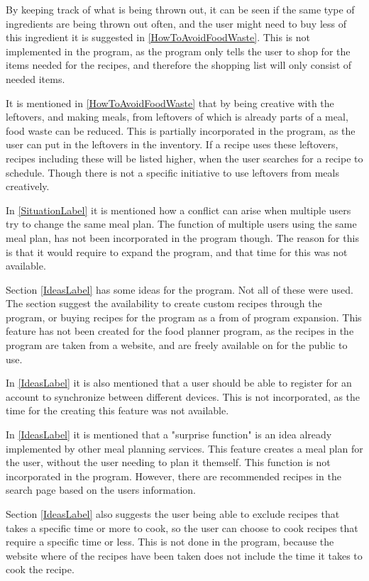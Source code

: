 By keeping track of what is being thrown out, it can be seen if the same type of ingredients are being thrown out often, and the user might need to buy less of this ingredient it is suggested in \cref{HowToAvoidFoodWaste}. This is not implemented in the program, as the program only tells the user to shop for the items needed for the recipes, and therefore the shopping list will only consist of needed items. 

It is mentioned in \cref{HowToAvoidFoodWaste} that by being creative with the leftovers, and making meals, from leftovers of which is already parts of a meal, food waste can be reduced. This is partially incorporated in the program, as the user can put in the leftovers in the inventory. If a recipe uses these leftovers, recipes including these will be listed higher, when the user searches for a recipe to schedule. Though there is not a specific initiative to use leftovers from meals creatively.

In \cref{SituationLabel} it is mentioned how a conflict can arise when multiple users try to change the same meal plan. The function of multiple users using the same meal plan, has not been incorporated in the program though. The reason for this is that it would require to expand the program, and that time for this was not available.

Section \ref{IdeasLabel} has some ideas for the program. Not all of these were used. The section suggest the availability to create custom recipes through the program, or buying recipes for the program as a from of program expansion. This feature has not been created for the food planner program, as the recipes in the program are taken from a website, and are freely available on for the public to use.

In \cref{IdeasLabel} it is also mentioned that a user should be able to register for an account to synchronize between different devices. This is not incorporated, as the time for the creating this feature was not available.

In \cref{IdeasLabel} it is mentioned that a "surprise function" is an idea already implemented by other meal planning services. This feature creates a meal plan for the user, without the user needing to plan it themself. This function is not incorporated in the program. However, there are recommended recipes in the search page based on the users information.

Section \ref{IdeasLabel} also suggests the user being able to exclude recipes that takes a specific time or more to cook, so the user can choose to cook recipes that require a specific time or less. This is not done in the program, because the website where of the recipes have been taken does not include the time it takes to cook the recipe.

